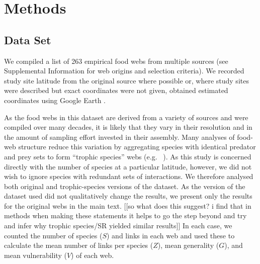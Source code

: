 \documentclass[12pt]{article}
\begin{document}
\section*{Methods}

\subsection*{Data Set} 

We compiled a list of 263 empirical food webs from
multiple sources (see Supplemental Information for web origins and selection
criteria). We recorded study site latitude from the original source where
possible or, where study sites were described but exact coordinates were not
given, obtained estimated coordinates using Google Earth \citep{GoogleEarth}.



As the food webs in this dataset are derived from a variety of sources and were compiled over many decades, it
is likely that they vary in their resolution and in the amount of sampling effort invested in their assembly.
Many analyses of food-web structure reduce this variation by aggregating species with identical predator and prey
sets to form ``trophic species'' webs (e.g. ~\citep{Martinez1991,Vermaat2009,Dunne2004,Dunne2013}). As this study
is concerned directly with the number of species at a particular latitude, however, we did not wish to ignore 
species with redundant sets of interactions. We therefore analysed both original and trophic-species versions
of the dataset. As the version of the dataset used did not qualitatively change the results, we present only
the results for the original webs in the main text. [[so what does this suggest? i find that in methods when making these statements it helps to go the step beyond and try and infer why trophic species/SR yielded similar results]] In each case, we counted the number of species ($S$) and 
links in each web and used these to calculate the mean number of links per species ($Z$), mean generality 
($G$), and mean vulnerability ($V$) of each web. 
\end{document}
